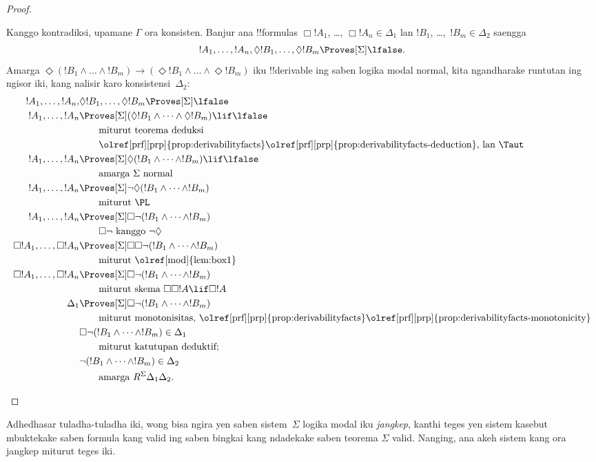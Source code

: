 \documentclass[../../../include/open-logic-section]{subfiles}
\begin{document}
\begin{proof}
\begin{enumerate}
    Kanggo kontradiksi, upamane $\Gamma$ ora konsisten. Banjur ana
    !!{formula}s $\Box!A_1$, \dots, $\Box!A_n \in \Delta_1$
    lan $!B_1$, \dots,~$!B_m \in \Delta_2$ saengga \[!A_1, \dots,
    !A_n, \Diamond!B_1, \dots, \Diamond!B_m \Proves[\Sigma]
    \lfalse.\] Amarga $\Diamond (!B_1 \land \dots \land !B_m) \to
    (\Diamond!B_1 \land \dots \land \Diamond!B_m)$ iku !!{derivable}
    ing saben logika modal normal, kita ngandharake runtutan ing ngisor
    iki, kang nalisir karo konsistensi~$\Delta_2$:
    \begin{align*}
      !A_1, \dots, !A_n, & \Diamond!B_1, \dots,
      \Diamond!B_m \Proves[\Sigma] \lfalse \\
      !A_1, \dots,!A_n & \Proves[\Sigma] (\Diamond!B_1 \land
      \dots \land \Diamond!B_m) \lif \lfalse\\
      & \qquad\text{miturut teorema deduksi}\\
      & \qquad\text{\olref[prf][prp]{prop:derivabilityfacts}\olref[prf][prp]{prop:derivabilityfacts-deduction}, lan \Taut} \\
      !A_1, \dots,!A_n & \Proves[\Sigma]
      \Diamond(!B_1 \land
      \dots \land !B_m) \lif \lfalse\\
      & \qquad \text{amarga $\Sigma$ normal} \\
      !A_1, \dots,!A_n & \Proves[\Sigma]
      \lnot\Diamond (!B_1 \land \dots \land !B_m)\\
      & \qquad\text{miturut \PL} \\
      !A_1, \dots,!A_n & \Proves[\Sigma]
      \Box\lnot (!B_1 \land \dots \land !B_m)\\
      & \qquad\text{$\Box\lnot$ kanggo $\lnot\Diamond$} \\
      \Box!A_1, \dots,\Box!A_n
      & \Proves[\Sigma] \Box\Box \lnot (!B_1 \land \dots \land !B_m)\\
      & \qquad\text{miturut \olref[mod]{lem:box1}} \\
      \Box!A_1, \dots,\Box!A_n
      & \Proves[\Sigma]
      \Box\lnot (!B_1 \land \dots \land !B_m)\\
      &\qquad\text{miturut skema $\Box\Box!A \lif \Box!A$} \\
      \Delta_1 & \Proves[\Sigma]
      \Box\lnot (!B_1 \land \dots \land !B_m)\\
      &\qquad\text{miturut monotonisitas, \olref[prf][prp]{prop:derivabilityfacts}\olref[prf][prp]{prop:derivabilityfacts-monotonicity}} \\
      & \Box\lnot (!B_1 \land \dots \land !B_m) \in \Delta_1\\
      &\qquad\text{miturut katutupan deduktif}; \\
      & \lnot (!B_1 \land \dots \land !B_m) \in \Delta_2\\
      &\qquad \text{amarga }
      R^\Sigma \Delta_1\Delta_2. 
    \end{align*}
  \end{enumerate}
\end{proof}

Adhedhasar tuladha-tuladha iki, wong bisa ngira yen saben
sistem~$\Sigma$ logika modal iku \emph{jangkep}, kanthi teges yen
sistem kasebut mbuktekake saben formula kang valid ing saben bingkai
kang ndadekake saben teorema $\Sigma$ valid. Nanging, ana akeh sistem
kang ora jangkep miturut teges iki.
\end{document}
